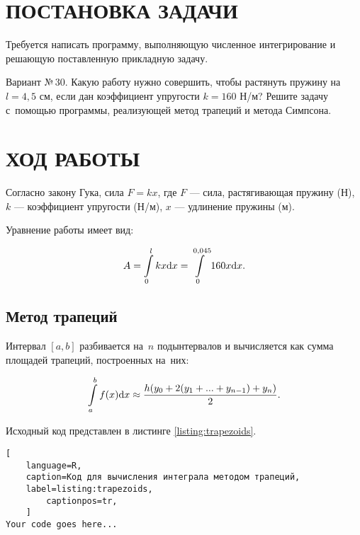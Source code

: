 \documentclass[14pt]{extarticle}
\begin{document}


\cfoot{\thepage}

\section{\MakeUppercase{Постановка задачи}}

Требуется написать программу, выполняющую численное интегрирование и решающую поставленную прикладную задачу.

Вариант №\,30. Какую работу нужно совершить, чтобы растянуть пружину на $l = 4{,}5$ см, если дан коэффициент упругости $k = 160$ Н/м? Решите задачу с~помощью программы, реализующей метод трапеций и метода Симпсона.

\newpage

\section{\MakeUppercase{Ход работы}}

Согласно закону Гука, сила $F = kx$, где $F$ --- сила, растягивающая пружину (Н), $k$ --- коэффициент упругости (Н/м), $x$ --- удлинение пружины (м).

Уравнение работы имеет вид:

$$
A
= \int\displaylimits_{0}^{l} kx \mathrm{d}x
= \int\displaylimits_{0}^{0{,}045} 160x \mathrm{d}x.
$$


\vspace{1.5em}\subsection{Метод трапеций}

Интервал $[a, b]$ разбивается на~$n$ подынтервалов и вычисляется как сумма площадей трапеций, построенных на~них:

$$
\int\displaylimits_{a}^{b} f(x) \mathrm{d}x
\approx \dfrac{h (y_0 + 2(y_1 + ... + y_{n-1}) + y_n)}{2}.
$$

\vspace{1.5em}
Исходный код представлен в листинге \ref{listing:trapezoids}.

\begin{lstlisting}[
	language=R,
	caption=Код для вычисления интеграла методом трапеций,
	label=listing:trapezoids,
        captionpos=tr,
	]
Your code goes here...
\end{lstlisting}

\end{document}
